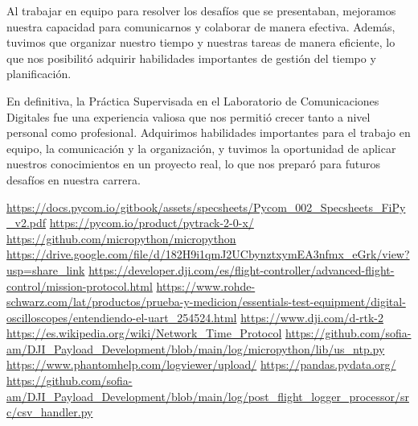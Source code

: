\documentclass[12pt]{article}
\begin{document}
Al trabajar en equipo para resolver los desafíos que se presentaban, mejoramos nuestra capacidad para comunicarnos y colaborar de manera efectiva. Además, tuvimos que organizar nuestro tiempo y nuestras tareas de manera eficiente, lo que nos posibilitó adquirir habilidades importantes de gestión del tiempo y planificación.

En definitiva, la Práctica Supervisada en el Laboratorio de Comunicaciones Digitales fue una experiencia valiosa que nos permitió crecer tanto a nivel personal como profesional. Adquirimos habilidades importantes para el trabajo en equipo, la comunicación y la organización, y tuvimos la oportunidad de aplicar nuestros conocimientos en un proyecto real, lo que nos preparó para futuros desafíos en nuestra carrera.

\clearpage
{}
\begin{thebibliography}{9}
 \url{https://docs.pycom.io/gitbook/assets/specsheets/Pycom_002_Specsheets_FiPy_v2.pdf}
 \url{https://pycom.io/product/pytrack-2-0-x/} 
 \url{https://github.com/micropython/micropython}
 \url{https://drive.google.com/file/d/182H9i1qmJ2UCbynztxymEA3nfmx_eGrk/view?usp=share_link}
 \url{https://developer.dji.com/es/flight-controller/advanced-flight-control/mission-protocol.html}
 \url{https://www.rohde-schwarz.com/lat/productos/prueba-y-medicion/essentials-test-equipment/digital-oscilloscopes/entendiendo-el-uart_254524.html} 
 \url{https://www.dji.com/d-rtk-2}
 \url{https://es.wikipedia.org/wiki/Network_Time_Protocol}
 \url{https://github.com/sofia-am/DJI_Payload_Development/blob/main/log/micropython/lib/us_ntp.py}
 \url{https://www.phantomhelp.com/logviewer/upload/}
 \url{https://pandas.pydata.org/}
 \url{https://github.com/sofia-am/DJI\_Payload\_Development/blob/main/log/post\_flight\_logger\_processor/src/csv\_handler.py}

\end{thebibliography}
\end{document}
